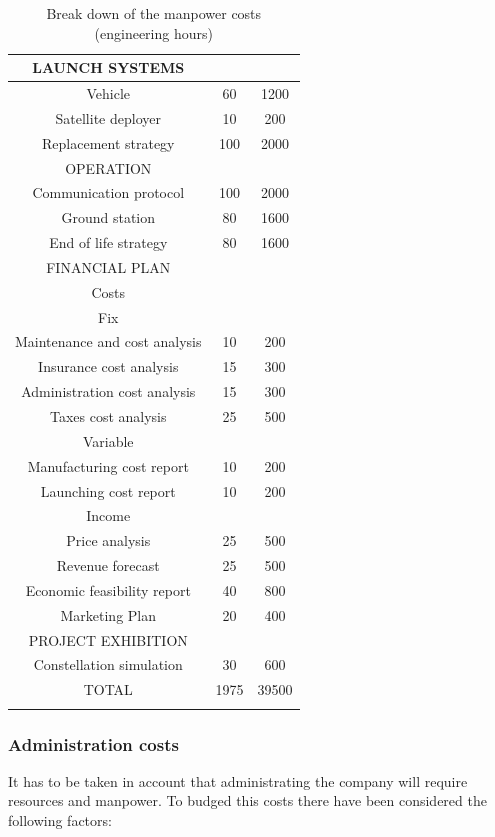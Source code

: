 \begin{longtable}{ccc}
	\rowcolor[gray]{0.85}
	LAUNCH SYSTEMS &  &  \\ \hline
	Vehicle & 60 & 1200 \\ \hline
	Satellite deployer & 10 & 200 \\ \hline
	Replacement strategy & 100 & 2000 \\ \hline
	\rowcolor[gray]{0.85}
	OPERATION &  &  \\ \hline
	Communication protocol & 100 & 2000 \\ \hline
	Ground station & 80 & 1600 \\ \hline
	End of life strategy & 80 & 1600 \\ \hline
	\rowcolor[gray]{0.85}
	FINANCIAL PLAN &  &  \\ \hline
	Costs &  &  \\ \hline
	Fix &  &  \\ \hline
	Maintenance and cost analysis & 10 & 200 \\ \hline
	Insurance cost analysis & 15 & 300 \\ \hline
	Administration cost analysis & 15 & 300 \\ \hline
	Taxes cost analysis & 25 & 500 \\ \hline
	Variable &  &  \\ \hline
	Manufacturing cost report & 10 & 200 \\ \hline
	Launching cost report & 10 & 200 \\ \hline
	Income &  &  \\ \hline
	Price analysis & 25 & 500 \\ \hline
	Revenue forecast & 25 & 500 \\ \hline
	Economic feasibility report & 40 & 800 \\ \hline
	Marketing Plan & 20 & 400 \\ \hline
	\rowcolor[gray]{0.85}
	PROJECT EXHIBITION &  &  \\ \hline
	Constellation simulation & 30 & 600 \\ \hline
	\rowcolor[gray]{0.65}
	TOTAL & 1975 & 39500 \\
	\bottomrule
\caption[Engineering Hours]{Break down of the manpower costs (engineering hours)}
\end{longtable}


\subsubsection{Administration costs}
It has to be taken in account that administrating the company will require resources and manpower. To budged this costs there have been considered the following factors:

